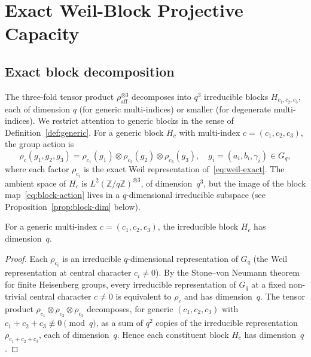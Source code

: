 \section{Exact Weil-Block Projective Capacity}
  \label{sec:exact-capacity}

  \subsection{Exact block decomposition}

    The three-fold tensor product $\rho_{\mathrm{aff}}^{\otimes 3}$ decomposes into $q^3$
    irreducible blocks $H_{c_1,c_2,c_3}$, each of dimension $q$ (for generic multi-indices)
    or smaller (for degenerate multi-indices).
    We restrict attention to generic blocks in the sense of Definition~\ref{def:generic}.
    For a generic block $H_c$ with multi-index $c=(c_1,c_2,c_3)$, the group action is
    \begin{equation}
      \rho_c(g_1,g_2,g_3) = \rho_{c_1}(g_1)\otimes\rho_{c_2}(g_2)\otimes\rho_{c_3}(g_3),
      \quad g_i=(a_i,b_i,\gamma_i)\in G_q,
      \label{eq:block-action}
    \end{equation}
    where each factor $\rho_{c_i}$ is the exact Weil representation of~\eqref{eq:weil-exact}.
    The ambient space of $H_c$ is $L^2(\mathbb{Z}/q\mathbb{Z})^{\otimes 3}$, of dimension~$q^3$,
    but the image of the block map~\eqref{eq:block-action} lives in a $q$-dimensional
    irreducible subspace (see Proposition~\ref{prop:block-dim} below).

    \begin{proposition}
      \label{prop:block-dim}
      For a generic multi-index $c=(c_1,c_2,c_3)$, the irreducible block $H_c$ has dimension~$q$.
    \end{proposition}

    \begin{proof}
      Each $\rho_{c_i}$ is an irreducible $q$-dimensional representation of $G_q$
      (the Weil representation at central character $c_i\neq 0$).
      By the Stone--von Neumann theorem for finite Heisenberg groups, every irreducible
      representation of $G_q$ at a fixed non-trivial central character $c\neq 0$ is
      equivalent to $\rho_c$ and has dimension~$q$.
      The tensor product $\rho_{c_1}\otimes\rho_{c_2}\otimes\rho_{c_3}$ decomposes, for
      generic $(c_1,c_2,c_3)$ with $c_1+c_2+c_3\not\equiv 0\pmod{q}$, as a sum of $q^2$
      copies of the irreducible representation $\rho_{c_1+c_2+c_3}$, each of dimension~$q$.
      Hence each constituent block $H_c$ has dimension~$q$.
    \end{proof}

